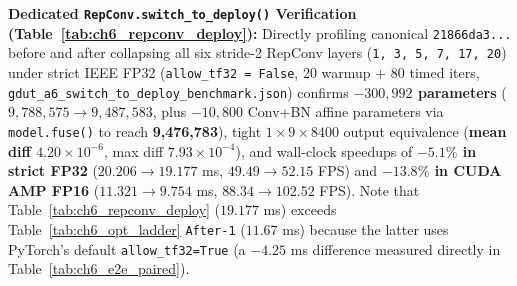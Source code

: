 \noindent\textbf{Dedicated \nolinkurl{RepConv.switch_to_deploy()} Verification (Table~\ref{tab:ch6_repconv_deploy}):} Directly profiling canonical \texttt{21866da3...} before and after collapsing all six stride-2 RepConv layers (\texttt{1, 3, 5, 7, 17, 20}) under strict IEEE FP32 (\nolinkurl{allow_tf32 = False}, 20 warmup + 80 timed iters, \nolinkurl{gdut_a6_switch_to_deploy_benchmark.json}) confirms \textbf{$-300,992$ parameters} ($9,788,575 \to 9,487,583$, plus $-10,800$ Conv+BN affine parameters via \texttt{model.fuse()} to reach \textbf{9,476,783}), tight $1 \times 9 \times 8400$ output equivalence (\textbf{mean diff $4.20 \times 10^{-6}$}, max diff $7.93 \times 10^{-4}$), and wall-clock speedups of \textbf{$-5.1\%$ in strict FP32} ($20.206 \to 19.177$ ms, $49.49 \to 52.15$ FPS) and \textbf{$-13.8\%$ in CUDA AMP FP16} ($11.321 \to 9.754$ ms, $88.34 \to 102.52$ FPS). Note that Table~\ref{tab:ch6_repconv_deploy} ($19.177$ ms) exceeds Table~\ref{tab:ch6_opt_ladder} \texttt{After-1} ($11.67$ ms) because the latter uses PyTorch's default \texttt{allow\_tf32=True} (a $-4.25$ ms difference measured directly in Table~\ref{tab:ch6_e2e_paired}).

\begin{table}[htbp]
\centering
\caption{Dedicated RTX 3050 Verification of \nolinkurl{RepConv.switch_to_deploy()} Across Six Stride-2 Blocks (layers 1, 3, 5, 7, 17, 20) on Canonical \texttt{GDUT\_A6\_YOLO11s} (\texttt{21866da3 $\to$ d422dd1d}).}
\label{tab:ch6_repconv_deploy}
\end{table}

